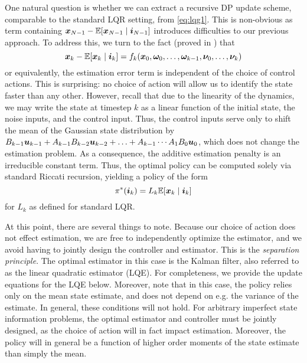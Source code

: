 One natural question is whether we can extract a recursive DP update scheme, comparable to the standard LQR setting, from \eqref{eq:lqg1}. This is non-obvious as term containing $\bm{x}_{N-1} - \mathbb{E}[\bm{x}_{N-1}\mid \bm{i}_{N-1}]$ introduces difficulties to our previous approach. To address this, we turn to the fact (proved in \cite{bertsekas1995dynamic}) that 
\begin{equation}
    \bm{x}_{k} - \mathbb{E}[\bm{x}_{k}\mid \bm{i}_{k}] = f_k(\bm{x}_0, \bm{\omega}_0,\ldots,\bm{\omega}_{k-1}, \bm{\nu}_0, \ldots, \bm{\nu}_{k})
\end{equation}
or equivalently, the estimation error term is independent of the choice of control actions. This is surprising: no choice of action will allow us to identify the state faster than any other. However, recall that due to the linearity of the dynamics, we may write the state at timestep $k$ as a linear function of the initial state, the noise inputs, and the control input. Thus, the control inputs serve only to shift the mean of the Gaussian state distribution by  $B_{k-1} \bm{u}_{k-1} + A_{k-1} B_{k-2} \bm{u}_{k-2} + \ldots + A_{k-1} \cdots A_{1} B_{0} \bm{u}_0$, which does not change the estimation problem. As a consequence, the additive estimation penalty is an irreducible constant term. Thus, the optimal policy can be computed solely via standard Riccati recursion, yielding a policy of  the form
\begin{equation}
    \pi^*(\bm{i}_k) = L_k \mathbb{E}[\bm{x}_{k}\mid \bm{i}_{k}]
\end{equation}
for $L_k$ as defined for standard LQR.

At this point, there are several things to note. Because our choice of action does not effect estimation, we are free to independently optimize the estimator, and we avoid having to jointly design the controller and estimator. This is the \textit{separation principle}. The optimal estimator in this case is the Kalman filter, also referred to as the linear quadratic estimator (LQE). For completeness, we provide the update equations for the LQE below. Moreover, note that in this case, the policy relies only on the mean state estimate, and does not depend on e.g. the variance of the estimate. In general, these conditions will not hold. For arbitrary imperfect state information problems, the optimal estimator and controller must be jointly designed, as the choice of action will in fact impact estimation. Moreover, the policy will in general be a function of higher order moments of the state estimate than simply the mean. 


